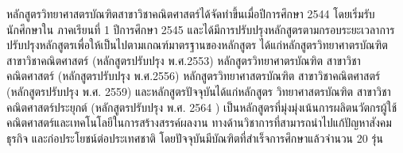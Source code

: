หลักสูตรวิทยาศาสตรบัณฑิตสาขาวิชาคณิตศาสตร์ได้จัดทำขึ้นเมื่อปีการศึกษา 2544 โดยเริ่มรับนักศึกษาใน ภาคเรียนที่ 1 ปีการศึกษา 2545  และได้มีการปรับปรุงหลักสูตรตามกรอบระยะเวลาการปรับปรุงหลักสูตรเพื่อให้เป็นไปตามเกณฑ์มาตรฐานของหลักสูตร ได้แก่หลักสูตรวิทยาศาตรบัณฑิต สาขาวิชาคณิตศาสตร์ (หลักสูตรปรับปรุง พ.ศ.2553) หลักสูตรวิทยาศาตรบัณฑิต สาขาวิชาคณิตศาสตร์ (หลักสูตรปรับปรุง พ.ศ.2556) หลักสูตรวิทยาศาสตรบัณฑิต สาขาวิชาคณิตศาสตร์ (หลักสูตรปรับปรุง พ.ศ. 2559) และหลักสูตรปัจจุบันได้แก่หลักสูตร วิทยาศาสตรบัณฑิต สาขาวิชาคณิตศาสตร์ประยุกต์ (หลักสูตรปรับปรุง พ.ศ. 2564 ) เป็นหลักสูตรที่มุ่งมุ่งเน้นการผลิตนวัตกรผู้ใช้คณิตศาสตร์และเทคโนโลยีในการสร้างสรรค์ผลงาน ทางด้านวิชาการที่สามารถนำไปแก้ปัญหาสังคม ธุรกิจ และก่อประโยชน์ต่อประเทศชาติ โดยปัจจุบันมีบัณฑิตที่สำเร็จการศึกษาแล้วจำนวน 20 รุ่น


